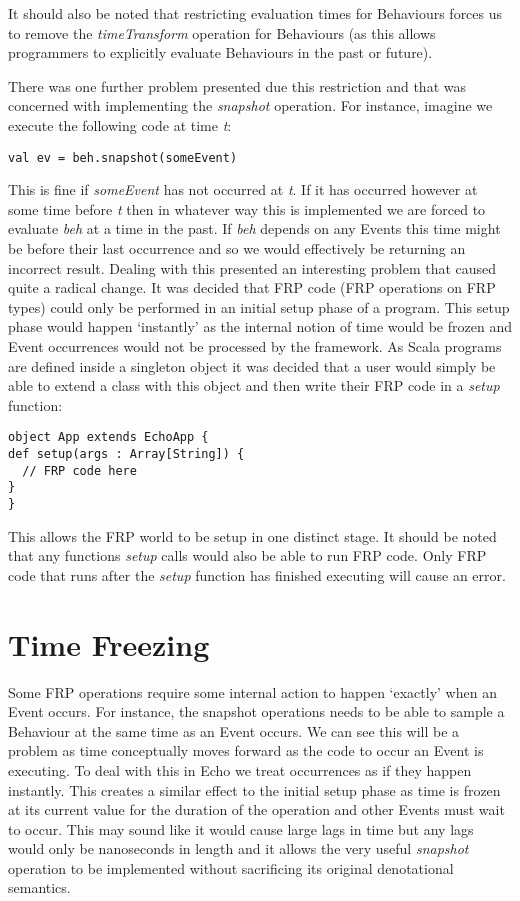     It should also be noted that restricting evaluation times for Behaviours forces us
    to remove the \emph{timeTransform} operation for Behaviours (as this allows programmers to explicitly
    evaluate Behaviours in the past or future).
    
    There was one further problem presented due this restriction and that was concerned with
    implementing the \emph{snapshot} operation. For instance, imagine we execute the following code
    at time \emph{t}:
    
\begin{verbatim}
val ev = beh.snapshot(someEvent)
\end{verbatim}

    This is fine if \emph{someEvent} has not occurred at \emph{t}. If it has occurred however at some time
    before \emph{t} then in whatever way this is implemented we are forced to evaluate \emph{beh}
    at a time in the past. If \emph{beh} depends on any Events this time might be before their
    last occurrence and so we would effectively be returning an incorrect result. Dealing with this
    presented an interesting problem that caused quite a radical change. It was decided that FRP
    code (FRP operations on FRP types) could only be performed in an initial setup phase of a program.
    This setup phase would happen `instantly' as the internal notion of time would be frozen and Event
    occurrences would not be processed by the framework. As Scala programs are defined inside a singleton
    object it was decided that a user would simply be able to extend a class with this object and then
    write their FRP code in a \emph{setup} function:

\begin{verbatim}
object App extends EchoApp {
def setup(args : Array[String]) {
  // FRP code here
}
}
\end{verbatim}

    This allows the FRP world to be setup in one distinct stage. It should be noted that
    any functions \emph{setup} calls would also be able to run FRP code. Only FRP code that runs
    after the \emph{setup} function has finished executing will cause an error.
    
  \section{Time Freezing}
    Some FRP operations require some internal action to happen `exactly' when an Event occurs. For instance,
    the snapshot operations needs to be able to sample a Behaviour at the same time as an Event occurs.
    We can see this will be a problem as time conceptually moves forward as the code to
    occur an Event is executing. To deal with this in Echo we treat occurrences as if they happen instantly. This
    creates a similar effect to the initial setup phase as time is frozen at its current value for the duration
    of the operation and other Events must wait to occur. This may sound like it would cause large lags in time
    but any lags would only be nanoseconds in length and it allows the very useful \emph{snapshot} operation
    to be implemented without sacrificing its original denotational semantics.
  
